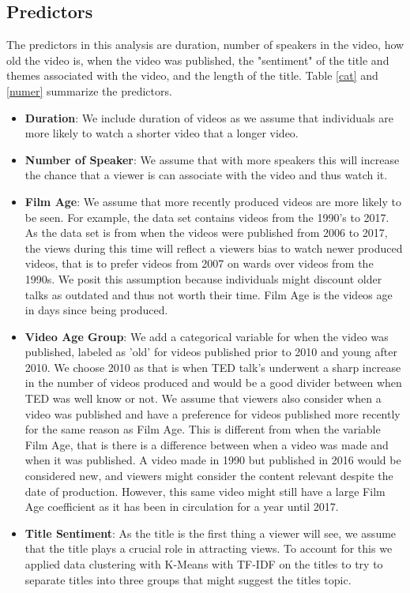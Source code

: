 \subsection{Predictors}
The predictors in this analysis are duration, number of speakers in the video, how old the video is, when the video was published, the "sentiment" of the title and themes associated with the video, and the length of the title. Table \ref{cat} and \ref{numer} summarize the predictors.
\begin{itemize}
	\item \textbf{Duration}: We include duration of videos as we assume that individuals are more likely to watch a shorter video that a longer video.
	\item \textbf{Number of Speaker}: We assume that with more speakers this will increase the chance that a viewer is can associate with the video and thus watch it. 
	\item \textbf{Film Age}: We assume that more recently produced videos are more likely to be seen. For example, the data set contains videos from the 1990's to 2017.  As the data set is from when the videos were published from 2006 to 2017, the views during this time will reflect a viewers bias to watch newer produced videos, that is to prefer videos from 2007 on wards over videos from the 1990s. We posit this assumption because individuals might discount older talks as outdated and thus not worth their time. Film Age is the videos age in days since being produced.
	\item \textbf{Video Age Group}: We add a categorical variable for when the video was published, labeled as 'old' for videos published prior to 2010 and young after 2010. We choose 2010 as that is when TED talk's underwent a sharp increase in the number of videos produced and would be a good divider between when TED was well know or not. We assume that viewers also consider when a video was published and have a preference for videos published more recently for the same reason as Film Age. This is different from when the variable Film Age, that is there is a difference between when a video was made and when it was published. A video made in 1990 but published in 2016 would be considered new, and viewers might consider the content relevant despite the date of production. However, this same video might still have a large Film Age coefficient as it has been in circulation for a year until 2017.  
	\item \textbf{Title Sentiment}: As the title is the first thing a viewer will see, we assume that the title plays a crucial role in attracting views. To account for this we applied data clustering with K-Means with TF-IDF on the titles to try to separate titles into three groups that might suggest the titles topic.

\end{itemize}
